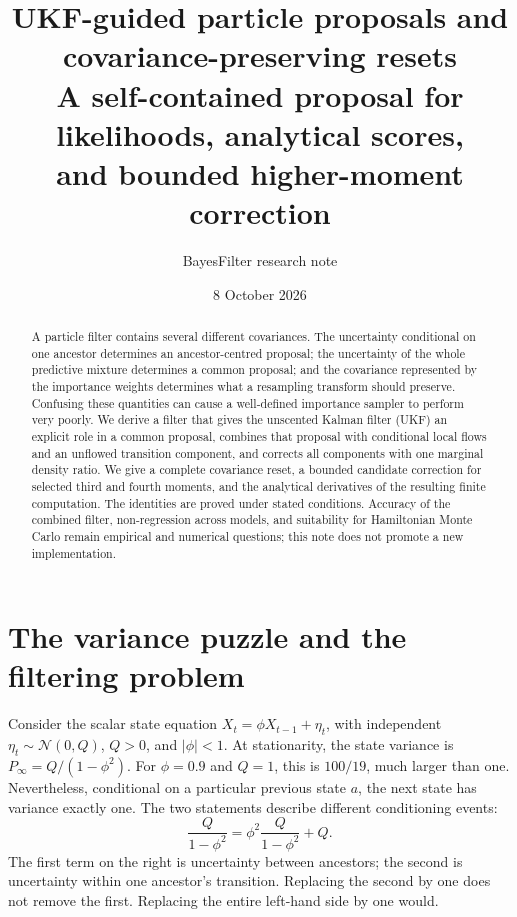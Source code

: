 \documentclass[11pt,a4paper]{article}
\title{UKF-guided particle proposals and covariance-preserving resets\\
\large A self-contained proposal for likelihoods, analytical scores,\\
and bounded higher-moment correction}
\author{BayesFilter research note}
\date{8 October 2026}
\newcommand{\Ncal}{\mathcal N}
\begin{document}
\maketitle

\begin{abstract}
A particle filter contains several different covariances. The uncertainty
conditional on one ancestor determines an ancestor-centred proposal; the
uncertainty of the whole predictive mixture determines a common proposal; and
the covariance represented by the importance weights determines what a
resampling transform should preserve. Confusing these quantities can cause a
well-defined importance sampler to perform very poorly. We derive a filter
that gives the unscented Kalman filter (UKF) an explicit role in a common
proposal, combines that proposal with conditional local flows and an unflowed
transition component, and corrects all components with one marginal density
ratio. We give a complete covariance reset, a bounded candidate correction for
selected third and fourth moments, and the analytical derivatives of the
resulting finite computation. The identities are proved under stated
conditions. Accuracy of the combined filter, non-regression across models,
and suitability for Hamiltonian Monte Carlo remain empirical and numerical
questions; this note does not promote a new implementation.
\end{abstract}

\tableofcontents

\section{The variance puzzle and the filtering problem}

Consider the scalar state equation
\(X_t=\phi X_{t-1}+\eta_t\), with independent
\(\eta_t\sim\Ncal(0,Q)\), \(Q>0\), and \(|\phi|<1\).
At stationarity, the state variance is \(P_\infty=Q/(1-\phi^2)\).
For \(\phi=0.9\) and \(Q=1\), this is \(100/19\), much larger than one.
Nevertheless, conditional on a particular previous state \(a\), the next
state has variance exactly one. The two statements describe different
conditioning events:
\begin{equation}
\label{eq:ar1-total}
 \frac{Q}{1-\phi^2}
 =\phi^2\frac{Q}{1-\phi^2}+Q.
\end{equation}
The first term on the right is uncertainty between ancestors; the second is
uncertainty within one ancestor's transition. Replacing the second by one
does not remove the first. Replacing the entire left-hand side by one would.
\end{document}

